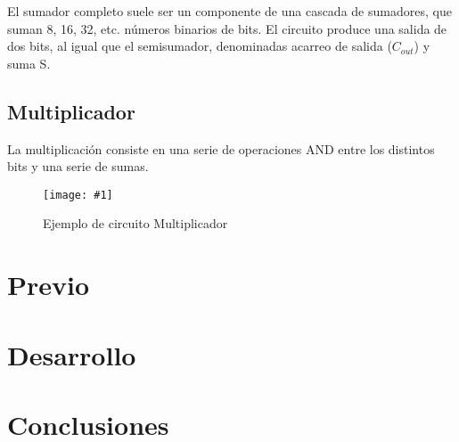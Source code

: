 \documentclass{mylib/reporteConCalif}
\newcommand{\insertImage}[3]{
	\begin{figure}[H]
		\centering
		\texttt{[image: \#1]}
		\caption{#2}
	\end{figure}
}
\begin{document}
 El sumador completo suele ser un componente de una cascada de sumadores, que suman 8, 16, 32, etc. números binarios de bits. El circuito produce una salida de dos bits, al igual que el semisumador, denominadas acarreo de salida ($C_{out}$) y suma S.

\subsection{Multiplicador}
La multiplicación consiste en una serie de operaciones AND entre los distintos bits y una serie de sumas.

\insertImage{img/labdise_pract6/mult}{Ejemplo de circuito Multiplicador}{5}

\newpage
\section{Previo}

\newpage
\section{Desarrollo}



\section{Conclusiones}
\end{document}
